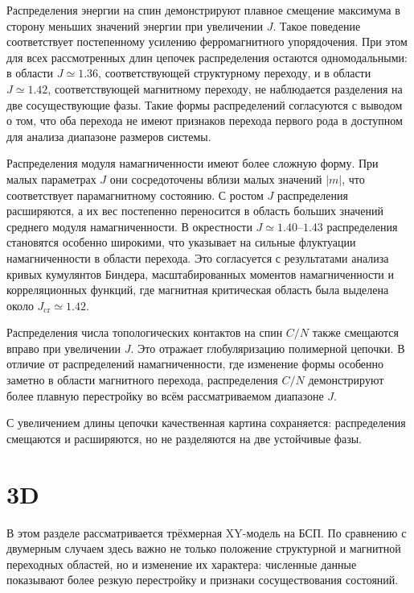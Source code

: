  Распределения энергии на спин демонстрируют плавное смещение максимума в сторону меньших значений энергии при увеличении $J$. 
 Такое поведение  соответствует постепенному усилению ферромагнитного упорядочения.
  При этом для всех рассмотренных длин цепочек распределения остаются одномодальными: в области $J\simeq 1.36$, соответствующей структурному переходу, и в области $J\simeq 1.42$, соответствующей магнитному переходу, не наблюдается  разделения на две сосуществующие фазы. Такие формы распределений согласуются с выводом о том, что оба перехода не имеют признаков перехода первого рода в доступном для анализа диапазоне размеров системы.
 
 Распределения модуля намагниченности имеют более сложную форму. 
 При малых  параметрах $J$ они сосредоточены вблизи малых значений $|m|$, что соответствует парамагнитному состоянию. 
 С ростом $J$ распределения расширяются, а их вес постепенно переносится в область больших значений среднего модуля намагниченности. 
 В окрестности $J\simeq 1.40$--$1.43$ распределения становятся особенно широкими, что указывает на сильные флуктуации намагниченности в области перехода. 
Это согласуется с результатами анализа кривых кумулянтов Биндера, масштабированных моментов намагниченности и корреляционных функций, где магнитная критическая область была выделена около $J_{\mathrm{cr}}\simeq 1.42$.

Распределения числа топологических контактов на спин $C/N$ также смещаются вправо при увеличении $J$. Это отражает глобуляризацию  полимерной цепочки. 
В отличие от распределений намагниченности, где изменение формы особенно заметно в области магнитного перехода, распределения $C/N$ демонстрируют более плавную перестройку во всём рассматриваемом диапазоне $J$.

 
 
 

 
 С увеличением длины цепочки качественная картина сохраняется: распределения смещаются и расширяются, но не разделяются на две устойчивые фазы.  
 
 
 
 \section{3D}
 
 В этом разделе рассматривается трёхмерная XY-модель на БСП. 
 По сравнению с двумерным случаем здесь важно не только положение структурной и магнитной переходных областей, но и изменение их характера: численные данные показывают более резкую перестройку и признаки сосуществования состояний.
 
